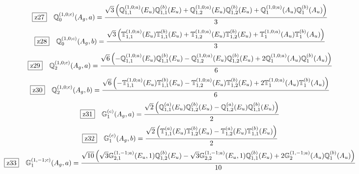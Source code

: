 \documentclass[fleqn,10pt,landscape]{jsarticle}
\begin{document}
\begin{dmath*}
\hspace*{3mm}\fbox{z27}\quad \mathbb{Q}_{0}^{(1,0;c)}(A_{g},a)=\frac{\sqrt{3} \left(\mathbb{Q}_{1,1}^{(1,0;a)}(E_{u}) \mathbb{Q}_{1,1}^{(b)}(E_{u}) + \mathbb{Q}_{1,2}^{(1,0;a)}(E_{u}) \mathbb{Q}_{1,2}^{(b)}(E_{u}) + \mathbb{Q}_{1}^{(1,0;a)}(A_{u}) \mathbb{Q}_{1}^{(b)}(A_{u})\right)}{3}
\end{dmath*}
\begin{dmath*}
\hspace*{3mm}\fbox{z28}\quad \mathbb{Q}_{0}^{(1,0;c)}(A_{g},b)=\frac{\sqrt{3} \left(\mathbb{T}_{1,1}^{(1,0;a)}(E_{u}) \mathbb{T}_{1,1}^{(b)}(E_{u}) + \mathbb{T}_{1,2}^{(1,0;a)}(E_{u}) \mathbb{T}_{1,2}^{(b)}(E_{u}) + \mathbb{T}_{1}^{(1,0;a)}(A_{u}) \mathbb{T}_{1}^{(b)}(A_{u})\right)}{3}
\end{dmath*}
\begin{dmath*}
\hspace*{3mm}\fbox{z29}\quad \mathbb{Q}_{2}^{(1,0;c)}(A_{g},a)=\frac{\sqrt{6} \left(- \mathbb{Q}_{1,1}^{(1,0;a)}(E_{u}) \mathbb{Q}_{1,1}^{(b)}(E_{u}) - \mathbb{Q}_{1,2}^{(1,0;a)}(E_{u}) \mathbb{Q}_{1,2}^{(b)}(E_{u}) + 2 \mathbb{Q}_{1}^{(1,0;a)}(A_{u}) \mathbb{Q}_{1}^{(b)}(A_{u})\right)}{6}
\end{dmath*}
\begin{dmath*}
\hspace*{3mm}\fbox{z30}\quad \mathbb{Q}_{2}^{(1,0;c)}(A_{g},b)=\frac{\sqrt{6} \left(- \mathbb{T}_{1,1}^{(1,0;a)}(E_{u}) \mathbb{T}_{1,1}^{(b)}(E_{u}) - \mathbb{T}_{1,2}^{(1,0;a)}(E_{u}) \mathbb{T}_{1,2}^{(b)}(E_{u}) + 2 \mathbb{T}_{1}^{(1,0;a)}(A_{u}) \mathbb{T}_{1}^{(b)}(A_{u})\right)}{6}
\end{dmath*}
\begin{dmath*}
\hspace*{3mm}\fbox{z31}\quad \mathbb{G}_{1}^{(c)}(A_{g},a)=\frac{\sqrt{2} \left(\mathbb{Q}_{1,1}^{(a)}(E_{u}) \mathbb{Q}_{1,2}^{(b)}(E_{u}) - \mathbb{Q}_{1,2}^{(a)}(E_{u}) \mathbb{Q}_{1,1}^{(b)}(E_{u})\right)}{2}
\end{dmath*}
\begin{dmath*}
\hspace*{3mm}\fbox{z32}\quad \mathbb{G}_{1}^{(c)}(A_{g},b)=\frac{\sqrt{2} \left(\mathbb{T}_{1,1}^{(a)}(E_{u}) \mathbb{T}_{1,2}^{(b)}(E_{u}) - \mathbb{T}_{1,2}^{(a)}(E_{u}) \mathbb{T}_{1,1}^{(b)}(E_{u})\right)}{2}
\end{dmath*}
\begin{dmath*}
\hspace*{3mm}\fbox{z33}\quad \mathbb{G}_{1}^{(1,-1;c)}(A_{g},a)=\frac{\sqrt{10} \left(\sqrt{3} \mathbb{G}_{2,1}^{(1,-1;a)}(E_{u},1) \mathbb{Q}_{1,2}^{(b)}(E_{u}) - \sqrt{3} \mathbb{G}_{2,2}^{(1,-1;a)}(E_{u},1) \mathbb{Q}_{1,1}^{(b)}(E_{u}) + 2 \mathbb{G}_{2}^{(1,-1;a)}(A_{u}) \mathbb{Q}_{1}^{(b)}(A_{u})\right)}{10}
\end{dmath*}
\end{document}
